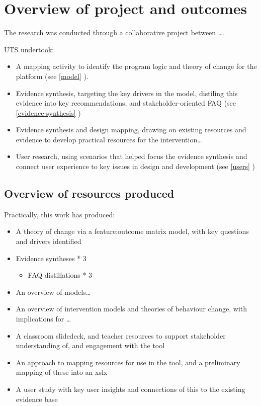 \documentclass[
]{book}
\providecommand{\tightlist}{%
  \setlength{\itemsep}{0pt}\setlength{\parskip}{0pt}}
\begin{document}
\hypertarget{overview-of-project-and-outcomes}{%
\section{Overview of project and outcomes}\label{overview-of-project-and-outcomes}}

The research was conducted through a collaborative project between \ldots.

UTS undertook:

\begin{itemize}
\tightlist
\item
  A mapping activity to identify the program logic and theory of change for the platform (see \ref{model} ).
\item
  Evidence synthesis, targeting the key drivers in the model, distiling this evidence into key recommendations, and stakeholder-oriented FAQ (see \ref{evidence-synthesis} )
\item
  Evidence synthesis and design mapping, drawing on existing resources and evidence to develop practical resources for the intervention\ldots{}
\item
  User research, using scenarios that helped focus the evidence synthesis and connect user experience to key issues in design and development (see \ref{users} )
\end{itemize}

\hypertarget{overview-of-resources-produced}{%
\subsection{Overview of resources produced}\label{overview-of-resources-produced}}

Practically, this work has produced:

\begin{itemize}
\tightlist
\item
  A theory of change via a feature:outcome matrix model, with key questions and drivers identified
\item
  Evidence syntheses * 3

  \begin{itemize}
  \tightlist
  \item
    FAQ distillations * 3
  \end{itemize}
\item
  An overview of models\ldots{}
\item
  An overview of intervention models and theories of behaviour change, with implications for \ldots{}
\item
  A classroom slidedeck, and teacher resources to support stakeholder understanding of, and engagement with the tool
\item
  An approach to mapping resources for use in the tool, and a preliminary mapping of these into an xslx
\item
  A user study with key user insights and connections of this to the existing evidence base
\end{itemize}
\end{document}
